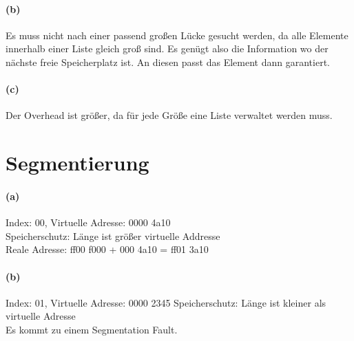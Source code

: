 \documentclass[a4paper]{article}
\begin{document}
\paragraph{(b)}
Es muss nicht nach einer passend großen Lücke gesucht werden, da alle Elemente innerhalb einer Liste gleich groß sind. Es genügt also die Information wo der nächste freie Speicherplatz ist. An diesen passt das Element dann garantiert.

\paragraph{(c)}
Der Overhead ist größer, da für jede Größe eine Liste verwaltet werden muss. 

\section{Segmentierung}
\paragraph{(a)}
Index: 00, Virtuelle Adresse: 0000 4a10\\
Speicherschutz: Länge ist größer virtuelle Addresse\\
Reale Adresse: ff00 f000 + 000 4a10 = ff01 3a10\\

\paragraph{(b)}
Index: 01, Virtuelle Adresse: 0000 2345
Speicherschutz: Länge ist kleiner als virtuelle Adresse\\
Es kommt zu einem Segmentation Fault.
\end{document}
